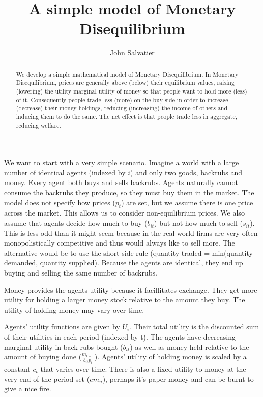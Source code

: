 \documentclass[14pt]{article} \usepackage{amsmath}
\title{A simple model of Monetary Disequilibrium}
\author{John Salvatier}
\begin{document}
\maketitle

\begin{abstract}
We develop a simple mathematical model of Monetary Disequilibrium. In Monetary Disequilibrium, prices are generally above (below) their equilibrium values, raising (lowering) the utility marginal utility of money so that people want to hold more (less) of it. 
Consequently people trade less (more) on the buy side in order to increase (decrease) their money holdings, reducing (increasing) the income of others and inducing them to do the same.
The net effect is that people trade less in aggregate, reducing welfare.
\end{abstract}

We want to start with a very simple scenario. Imagine a world with a large number of identical agents (indexed by $i$) and only two goods, backrubs and money. Every agent both buys and sells backrubs. Agents naturally cannot consume the backrubs they produce, so they must buy them in the market. The model does not specify how prices ($p_t$) are set, but we assume there is one price across the market. This allows us to consider non-equilibrium prices. We also assume that agents decide how much to buy ($b_{it}$) but not how much to sell ($s_{it}$). This is less odd than it might seem because in the real world firms are very often monopolistically competitive and thus would always like to sell more. The alternative would be to use the short side rule (quantity traded = min(quantity demanded, quantity supplied). Because the agents are identical, they end up buying and selling the same number of backrubs.

Money provides the agents utility because it facillitates exchange. They get more utility for holding a larger money stock relative to the amount they buy. The utility of holding money may vary over time.

Agents' utility functions are given by $U_i$. Their total utility is the discounted sum of their utilities in each period (indexed by t). The agents have decreasing marginal utility in back rubs bought ($b_{it}$) as well as money held relative to the amount of buying done ($\frac{m_{t-1}}{b_{it} p_t}$). Agents' utility of holding money is scaled by a constant $c_t$ that varies over time.  There is also a fixed utility to money at the very end of the period set ($e m_n$), perhaps it's paper money and can be burnt to give a nice fire.
\end{document}
